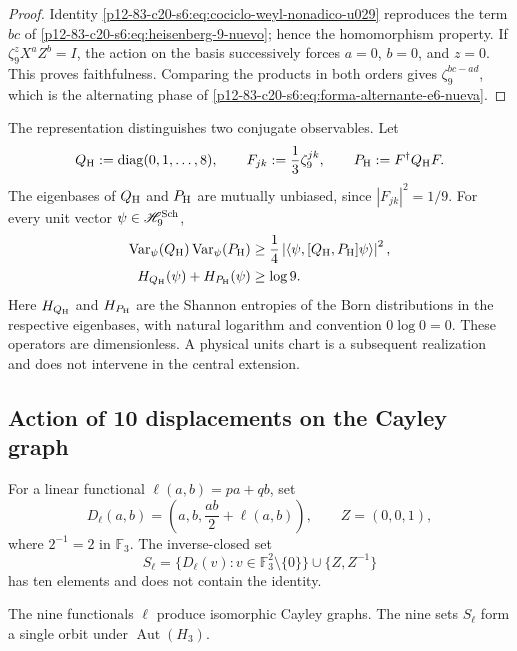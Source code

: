 \begin{proof}
Identity \eqref{p12-83-c20-s6:eq:cociclo-weyl-nonadico-u029} reproduces the term
\(bc\) of \eqref{p12-83-c20-s6:eq:heisenberg-9-nuevo}; hence the homomorphism
property. If \(\zeta_9^zX^aZ^b=I\), the action on the basis successively
forces \(a=0\), \(b=0\), and \(z=0\). This proves faithfulness. Comparing
the products in both orders gives
\(\zeta_9^{bc-ad}\), which is the alternating phase of
\eqref{p12-83-c20-s6:eq:forma-alternante-e6-nueva}.
\end{proof}

The representation distinguishes two conjugate observables. Let
\[
 Q_{\rm H}:=\operatorname{diag}(0,1,\ldots,8),
 \qquad
 F_{jk}:=\frac13\zeta_9^{jk},
 \qquad
 P_{\rm H}:=F^\dagger Q_{\rm H}F.
\]
The eigenbases of \(Q_{\rm H}\) and \(P_{\rm H}\) are mutually
unbiased, since \(|F_{jk}|^2=1/9\). For every unit vector
\(\psi\in\mathscr H_9^{\rm Sch}\),
\begin{align}
 \operatorname{Var}_\psi(Q_{\rm H})
 \operatorname{Var}_\psi(P_{\rm H})
 &\ge
 \frac14\left|
 \langle\psi,[Q_{\rm H},P_{\rm H}]\psi\rangle
 \right|^2,
 \label{p12-83-c20-s6:eq:incertidumbre-weyl-u029}\\
 H_{Q_{\rm H}}(\psi)+H_{P_{\rm H}}(\psi)
 &\ge\log9.
 \label{p12-83-c20-s6:eq:incertidumbre-entropica-weyl-u029}
\end{align}
Here \(H_{Q_{\rm H}}\) and \(H_{P_{\rm H}}\) are the Shannon entropies
of the Born distributions in the respective eigenbases,
with natural logarithm and convention \(0\log0=0\).
These operators are dimensionless. A physical units chart is a
subsequent realization and does not intervene in the central extension.

\subsection{Action of 10 displacements on the Cayley graph}

For a linear functional
\(\ell(a,b)=pa+qb\), set
\[
 D_\ell(a,b)=\left(a,b,\frac{ab}{2}+\ell(a,b)\right),
 \qquad Z=(0,0,1),
\]
where \(2^{-1}=2\) in \(\mathbb F_3\). The inverse-closed set
\begin{equation}
 S_\ell=
 \{D_\ell(v):v\in\mathbb F_3^2\setminus\{0\}\}
 \cup\{Z,Z^{-1}\}
 \label{p12-83-c20-s6:eq:conjunto-conexion-e6}
\end{equation}
has ten elements and does not contain the identity.

\begin{theorem}
\label{p12-83-c20-s6:thm:independencia-calibre-e6}
The nine functionals \(\ell\) produce isomorphic Cayley graphs. The
nine sets \(S_\ell\) form a single orbit under
\(\operatorname{Aut}(H_3)\).
\end{theorem}

